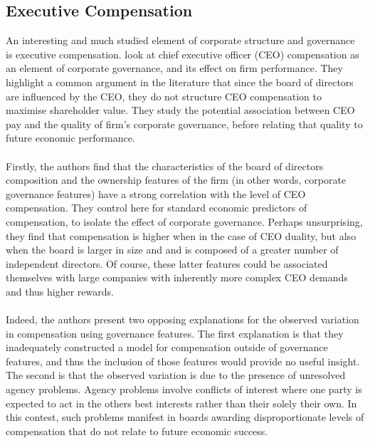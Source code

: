 \subsection {Executive Compensation}\label{execComp}
{An interesting and much studied element of corporate structure and governance is executive compensation. \cite{coreCompensation} look at chief executive officer (CEO) compensation as an element of corporate governance, and its effect on firm performance. They highlight a common argument in the literature that since the board of directors are influenced by the CEO, they do not structure CEO compensation to maximise shareholder value. They study the potential association between CEO pay and the quality of firm's corporate governance, before relating that quality to future economic performance. \\\\
Firstly, the authors find that the characteristics of the board of directors composition and the ownership features of the firm (in other words, corporate governance features) have a strong correlation with the level of CEO compensation. They control here for standard economic predictors of compensation, to isolate the effect of corporate governance. Perhaps unsurprising, they find that compensation is higher when in the case of CEO duality, but also when the board is larger in size and and is composed of a greater number of independent directors. Of course, these latter features could be associated themselves with large companies with inherently more complex CEO demands and thus higher rewards. \\\\
Indeed, the authors present two opposing explanations for the observed variation in compensation using governance features. The first explanation is that they inadequately constructed a model for compensation outside of governance features, and thus the inclusion of those features would provide no useful insight. The second is that the observed variation is due to the presence of unresolved agency problems. Agency problems involve conflicts of interest where one party is expected to act in the others best interests rather than their solely their own. In this contest, such problems manifest in boards awarding disproportionate levels of compensation that do not relate to future economic success. \\\\
}
